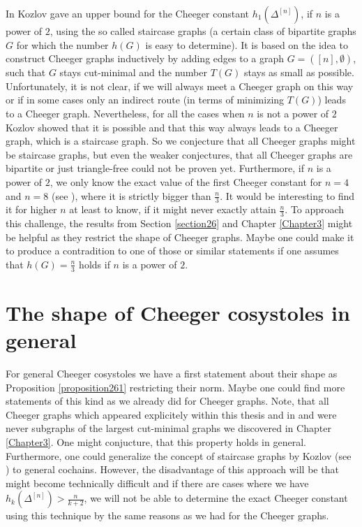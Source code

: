 In \cite{1} Kozlov gave an upper bound for the Cheeger constant \(h_1(\Delta^{[n]})\), if \(n\) is a power of \(2\), using the so called staircase graphs (a certain class of bipartite graphs \(G\) for which the number \(h(G)\) is easy to determine). It is based on the idea to construct Cheeger graphs inductively by adding edges to a graph \(G=([n],\emptyset)\), such that \(G\) stays cut-minimal and the number \(T(G)\) stays as small as possible. Unfortunately, it is not clear, if we will always meet a Cheeger graph on this way or if in some cases only an indirect route (in terms of minimizing \(T(G)\)) leads to a Cheeger graph. Nevertheless, for all the cases when \(n\) is not a power of \(2\) Kozlov showed that it is possible and that this way always leads to a Cheeger graph, which is a staircase graph. So we conjecture that all Cheeger graphs might be staircase graphs, but even the weaker conjectures, that all Cheeger graphs are bipartite or just triangle-free could not be proven yet. Furthermore, if \(n\) is a power of \(2\), we only know the exact value of the first Cheeger constant for \(n=4\) and \(n=8\) (see \cite{1}), where it is strictly bigger than \(\frac{n}{3}\). It would be interesting to find it for higher \(n\) at least to know, if it might never exactly attain \(\frac{n}{3}\). To approach this challenge, the results from Section \ref{section26} and Chapter \ref{Chapter3} might be helpful as they restrict the shape of Cheeger graphs. Maybe one could make it to produce a contradition to one of those or similar statements if one assumes that \(h(G)=\frac{n}{3}\) holds if \(n\) is a power of \(2\).

\section{The shape of Cheeger cosystoles in general}

For general Cheeger cosystoles we have a first statement about their shape as Proposition \ref{proposition261} restricting their norm. Maybe one could find more statements of this kind as we already did for Cheeger graphs. Note, that all Cheeger graphs which appeared explicitely within this thesis and in \cite{1} and \cite{6} were never subgraphs of the largest cut-minimal graphs we discovered in Chapter \ref{Chapter3}. One might conjucture, that this property holds in general. Furthermore, one could generalize the concept of staircase graphs by Kozlov (see \cite{1}) to general cochains. However, the disadvantage of this approach will be that might become technically difficult and if there are cases where we have \(h_k(\Delta^{[n]})>\frac{n}{k+2}\), we will not be able to determine the exact Cheeger constant using this technique by the same reasons as we had for the Cheeger graphs.


